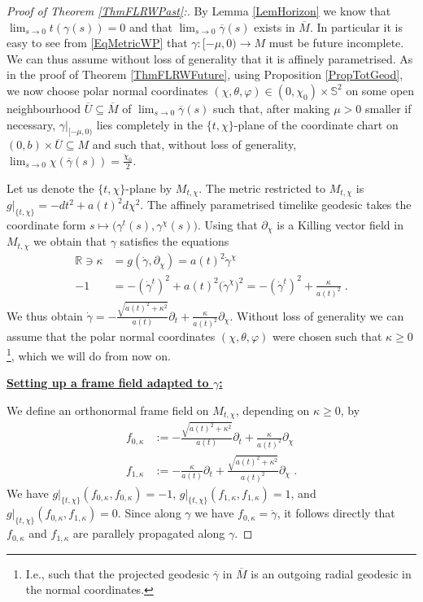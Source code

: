 \documentclass[reqno]{article}
\newcommand{\R}{\mathbb{R}}
\begin{document}
\begin{proof}[Proof of Theorem \ref{ThmFLRWPast}:]
By Lemma \ref{LemHorizon} we know that $\lim_{s \to 0} t(\gamma(s)) = 0$  and that $\lim_{s \to 0} \overline{\gamma}(s)$ exists in $\overline{M}$. In particular it is easy to see from \eqref{EqMetricWP} that $\gamma : [-\mu, 0 ) \to M$ must be future incomplete. We can thus assume without loss of generality that it is affinely parametrised.
As in the proof of Theorem \ref{ThmFLRWFuture}, using Proposition \ref{PropTotGeod}, we now choose polar normal coordinates $(\chi, \theta, \varphi) \in (0,\chi_0) \times \mathbb{S}^2$ on some open neighbourhood $\overline{U} \subseteq \overline{M}$ of $\lim_{s \to 0} \overline{\gamma}(s)$ such that, after making $\mu>0$ smaller if necessary, $\gamma|_{[-\mu,0)}$ lies completely in the $\{t, \chi\}$-plane of the coordinate chart on $(0,b) \times \overline{U} \subseteq M$   and such that, without loss of generality, $\lim_{s \to 0} \chi(\overline{\gamma}(s)) = \frac{\chi_0}{2}$. 

Let us denote the $\{t,\chi\}$-plane by $M_{t, \chi}$. The metric restricted to $M_{t, \chi}$ is $g|_{\{t,\chi\}} = -dt^2 + a(t)^2 d\chi^2$. The affinely parametrised timelike geodesic takes the coordinate form $s \mapsto \big(\gamma^t(s), \gamma^\chi(s)\big)$. Using that $\partial_\chi$ is a Killing vector field in $M_{t, \chi}$ we obtain that $\gamma$ satisfies the equations
\begin{equation*}
\begin{split}
\R \ni \kappa &= g(\dot{\gamma}, \partial_\chi) = a(t)^2 \dot{\gamma}^\chi \\
-1 &= - (\dot{\gamma}^t)^2 + a(t)^2 \big(\dot{\gamma}^\chi\big)^2 = - (\dot{\gamma}^t)^2 + \frac{\kappa}{a(t)^2} \;.
\end{split}
\end{equation*}
We thus obtain $\dot{\gamma} = - \frac{\sqrt{a(t)^2 + \kappa^2}}{a(t)} \partial_t + \frac{\kappa}{a(t)^2} \partial_\chi$. Without loss of generality we can assume that the polar normal coordinates $(\chi, \theta, \varphi)$ were chosen such that $\kappa \geq 0$\footnote{I.e., such that the projected geodesic $\overline{\gamma}$ in $\overline{M}$ is an outgoing radial geodesic in the normal coordinates.}, which we will do from now on.

\underline{\textbf{Setting up a frame field adapted to $\gamma$:}}

We define an orthonormal frame field on $M_{t, \chi}$, depending on $\kappa \geq 0$, by \begin{align*}
f_{0,\kappa} &:= -\frac{\sqrt{a(t)^2 + \kappa^2}}{a(t)} \partial_t + \frac{\kappa}{a(t)^2} \partial_\chi \\
f_{1,\kappa} &:= -\frac{\kappa}{a(t)} \partial_t + \frac{\sqrt{a(t)^2 + \kappa^2}}{a(t)^2} \partial_\chi \;.
\end{align*}
We have $g|_{\{t, \chi\}}(f_{0, \kappa}, f_{0, \kappa}) = -1$, $g|_{\{t, \chi\}}(f_{1, \kappa}, f_{1, \kappa}) = 1$, and $g|_{\{t, \chi\}}(f_{0, \kappa}, f_{1, \kappa}) = 0$. Since along $\gamma$ we have $f_{0, \kappa} = \dot{\gamma}$, it follows directly that $f_{0, \kappa}$ and $f_{1, \kappa}$ are parallely propagated along $\gamma$.


\end{proof}
\end{document}
